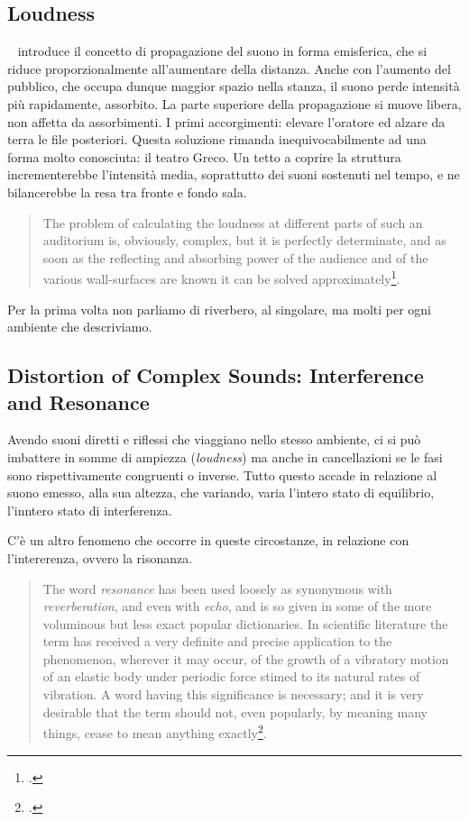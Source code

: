 \subsection{Loudness}

\ws~ introduce il concetto di propagazione
del suono in forma emisferica, che si riduce proporzionalmente all'aumentare della distanza. 
Anche con l'aumento del pubblico, che occupa dunque maggior spazio nella stanza,
il suono perde intensità più rapidamente, assorbito. La parte superiore della
propagazione si muove libera, non affetta da assorbimenti. I primi accorgimenti:
elevare l'oratore ed alzare da terra le file posteriori. 
Questa soluzione rimanda inequivocabilmente ad una forma molto conosciuta: il teatro Greco. Un tetto
a coprire la struttura incrementerebbe l'intensità media, soprattutto dei suoni
sostenuti nel tempo, e ne bilancerebbe la resa tra fronte e fondo sala.

\begin{quote}
  The problem of calculating the loudness at different parts of such an
  auditorium is, obviously, complex, but it is perfectly determinate, and as
  soon as the reflecting and absorbing power of the audience and of the various
  wall-surfaces are known it can be solved approximately\footcite{ws:rev}.
\end{quote}

Per la prima volta non parliamo di riverbero, al singolare, 
ma molti per ogni ambiente che descriviamo.

\subsection{Distortion of Complex Sounds: Interference and Resonance} 

Avendo suoni diretti e riflessi che viaggiano nello stesso ambiente, ci si può imbattere in somme
di ampiezza (\emph{loudness}) ma anche in cancellazioni se le fasi sono rispettivamente congruenti
o inverse. 
Tutto questo accade in relazione al suono emesso,
alla sua altezza, che variando, varia l'intero stato di equilibrio, l'inntero stato
di interferenza.

C'è un altro fenomeno che occorre in queste circostanze, in relazione con
l'intererenza, ovvero la risonanza.

\begin{quote}
  The word \emph{resonance} has been used loosely as synonymous with
  \emph{reverberation}, and even with \emph{echo}, and is so given in some of
  the more voluminous but less exact popular dictionaries. In scientific
  literature the term has received a very definite and precise application to
  the phenomenon, wherever it may occur, of the growth of a vibratory motion of
  an elastic body under periodic force stimed to its natural rates of vibration.
  A word having this significance is necessary; and it is very desirable that
  the term should not, even popularly, by meaning many things, cease to mean
  anything exactly\footcite{ws:rev}.
\end{quote}

